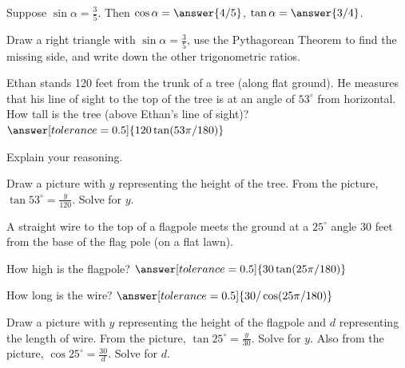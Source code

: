 \documentclass[nooutcomes]{ximera}
\begin{document}
\begin{problem}
Suppose $\sin\alpha = \frac{3}{5}$.  Then $\cos\alpha = \answer{4/5}$, $\tan\alpha = \answer{3/4}$.  
\begin{hint}Draw a right triangle with $\sin\alpha = \frac{3}{5}$, use the Pythagorean Theorem to find the missing side, 
and write down the other trigonometric ratios.\end{hint}
\end{problem}

\begin{problem}
Ethan stands 120 feet from the trunk of a tree (along flat ground). He measures that his line of sight to the top of the tree is at an angle of $53^\circ$ from horizontal. How tall is the tree (above Ethan's line of sight)?  $\answer[tolerance=0.5]{120\tan(53\pi/180)}$

Explain your reasoning.
\begin{hint}Draw a picture with $y$ representing the height of the tree.  From the picture, $\tan 53^\circ = \frac{y}{120}$.  Solve for $y$. \end{hint}
\end{problem}

\begin{problem}
A straight wire to the top of a flagpole meets the ground at a $25^\circ$ angle 30 feet from the base of the flag pole (on a flat lawn).  

How high is the flagpole?  $\answer[tolerance=0.5]{30\tan(25\pi/180)}$

How long is the wire?  $\answer[tolerance=0.5]{30/\cos(25\pi/180)}$
\begin{hint}Draw a picture with $y$ representing the height of the flagpole and $d$ representing the length of wire.  From the picture, $\tan 25^\circ = \frac{y}{30}$.  Solve for $y$.  Also from the picture, $\cos 25^\circ = \frac{30}{d}$.  Solve for $d$. 
\end{hint}
\end{problem}
\end{document}

